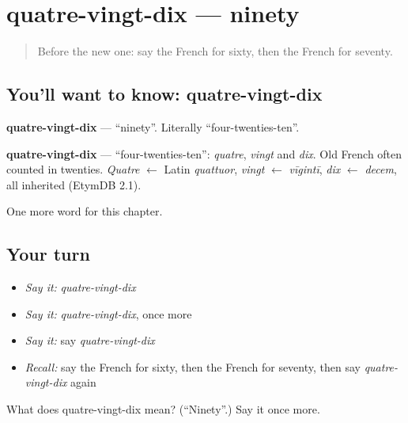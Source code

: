 \section[quatre-vingt-dix]{quatre-vingt-dix — ninety}

\label{lesson:FR-C136-quatre-vingt-dix}



\begin{quote}
Before the new one: say the French for sixty, then the French for seventy.
\end{quote}

\subsection*{You'll want to know: quatre-vingt-dix}
\textbf{quatre-vingt-dix} — \textquotedblleft{}ninety\textquotedblright{}. Literally \textquotedblleft{}four-twenties-ten\textquotedblright{}.

\begin{cousinweb}
\textbf{quatre-vingt-dix} — \textquotedblleft{}four-twenties-ten\textquotedblright{}: \emph{quatre}, \emph{vingt} and \emph{dix}. Old French often counted in twenties. \emph{Quatre} $\leftarrow$ Latin \emph{quattuor}, \emph{vingt} $\leftarrow$ \emph{vīgintī}, \emph{dix} $\leftarrow$ \emph{decem}, all inherited (EtymDB 2.1).
\end{cousinweb}

\begin{grammarlens}[title={What you've built}]
One more word for this chapter.
\end{grammarlens}

\subsection*{Your turn}
\begin{itemize}
\raggedright
  \item \emph{Say it:} \emph{quatre-vingt-dix}
  \item \emph{Say it:} \emph{quatre-vingt-dix}, once more
  \item \emph{Say it:} say \emph{quatre-vingt-dix}
  \item \emph{Recall:} say the French for sixty, then the French for seventy, then say \emph{quatre-vingt-dix} again
\end{itemize}

\begin{tcolorbox}[breakable,colback=teal!4,colframe=teal!35!black,title={Before you move on}]
What does quatre-vingt-dix mean? (\textquotedblleft{}Ninety\textquotedblright{}.) Say it once more.
\end{tcolorbox}
